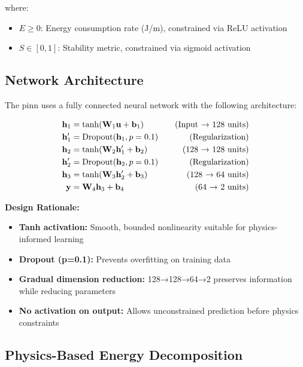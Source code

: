 where:
\begin{itemize}
    \item $E \geq 0$: Energy consumption rate (J/m), constrained via ReLU activation
    \item $S \in [0, 1]$: Stability metric, constrained via sigmoid activation
\end{itemize}

\subsection{Network Architecture}

The \acrshort{pinn} uses a fully connected neural network with the following architecture:

\begin{align}
\mathbf{h}_1 &= \tanh(\mathbf{W}_1 \mathbf{u} + \mathbf{b}_1) \quad &\text{(Input → 128 units)} \label{eq:layer1}\\
\mathbf{h}'_1 &= \text{Dropout}(\mathbf{h}_1, p=0.1) \quad &\text{(Regularization)} \label{eq:dropout1}\\
\mathbf{h}_2 &= \tanh(\mathbf{W}_2 \mathbf{h}'_1 + \mathbf{b}_2) \quad &\text{(128 → 128 units)} \label{eq:layer2}\\
\mathbf{h}'_2 &= \text{Dropout}(\mathbf{h}_2, p=0.1) \quad &\text{(Regularization)} \label{eq:dropout2}\\
\mathbf{h}_3 &= \tanh(\mathbf{W}_3 \mathbf{h}'_2 + \mathbf{b}_3) \quad &\text{(128 → 64 units)} \label{eq:layer3}\\
\mathbf{y} &= \mathbf{W}_4 \mathbf{h}_3 + \mathbf{b}_4 \quad &\text{(64 → 2 units)} \label{eq:output_layer}
\end{align}

\textbf{Design Rationale:}
\begin{itemize}
    \item \textbf{Tanh activation:} Smooth, bounded nonlinearity suitable for physics-informed learning
    \item \textbf{Dropout (p=0.1):} Prevents overfitting on training data
    \item \textbf{Gradual dimension reduction:} 128→128→64→2 preserves information while reducing parameters
    \item \textbf{No activation on output:} Allows unconstrained prediction before physics constraints
\end{itemize}

\subsection{Physics-Based Energy Decomposition}

